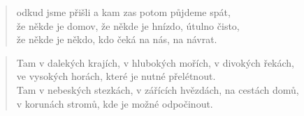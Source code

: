 \begin{song}{}
\begin{verse}
   odkud jsme přišli a kam zas potom půjdeme spát, \\
   že někde je domov, že někde je hnízdo, útulno čisto, \\
   že někde je někdo, kdo čeká na nás, na návrat.
\end{verse}
\begin{verse}
   Tam v dalekých krajích, v hlubokých mořích, v divokých řekách, \\
   ve vysokých horách, které je nutné přelétnout. \\
   Tam v nebeských stezkách, v zářících hvězdách, na cestách domů, \\
   v korunách stromů, kde je možné odpočinout.
\end{verse}
\begin{deco}
	    
\end{deco}
\end{song}
\pagebreak
